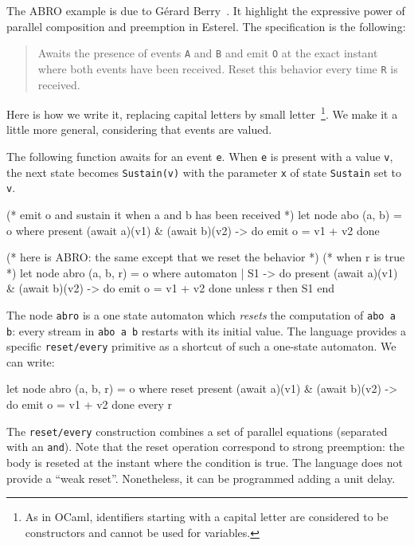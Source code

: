 \documentclass[11pt,titlepage,twoside]{report}
\newcommand{\ocaml}{{\sf OCaml}}
\begin{document}
The ABRO example is due to G\'erard Berry~\cite{esterel:primer99}. It
highlight the expressive power of parallel composition and preemption
in Esterel. The specification is the following:

\begin{quote}
Awaits the presence of events \verb-A- and \verb-B- and emit \verb-O-
at the exact instant where both events have been received.  Reset this
behavior every time \verb-R- is received.
\end{quote}
Here is how we write it, replacing capital letters by small
letter~\footnote{As in \ocaml, identifiers starting with a capital
  letter are considered to be constructors and cannot be used for
  variables.}. We make it a little more general, considering that
events are valued.

The following function awaits for an event \texttt{e}. When \texttt{e} is present with
a value \texttt{v}, the next state becomes \texttt{Sustain(v)} with the parameter
\texttt{x} of state \texttt{Sustain} set to \texttt{v}.
\begin{runverbatim}[withresult,include=await,label=abo]
(* emit o and sustain it when a and b has been received *)
let node abo (a, b) = o where
  present (await a)(v1) & (await b)(v2) -> do emit o = v1 + v2 done
\end{runverbatim}

\begin{runverbatim}
(* here is ABRO: the same except that we reset the behavior *)
(* when r is true *)
let node abro (a, b, r) = o where
  automaton
  | S1 ->
       do present (await a)(v1) & (await b)(v2) -> do emit o = v1 + v2 done
       unless r then S1
  end
\end{runverbatim}

The node \verb-abro- is a one state automaton which {\em resets} the
computation of \verb-abo a b-: every stream in \verb-abo a b- restarts
with its initial value. The language provides a specific
\verb-reset/every- primitive as a shortcut of such a one-state
automaton. We can write:

\begin{runverbatim}[withresult,include=await]
let node abro (a, b, r) = o where
  reset
    present (await a)(v1) & (await b)(v2) -> do emit o = v1 + v2 done
  every r
\end{runverbatim}

The \verb-reset/every- construction combines a set of parallel
equations (separated with an \verb-and-). Note that the reset
operation correspond to strong preemption: the body is reseted at the
instant where the condition is true. The language does not provide a
``weak reset''. Nonetheless, it can be programmed adding a unit delay.
\end{document}
